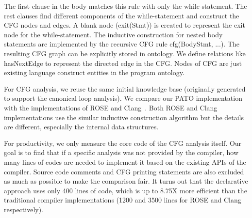 The first clause in the body matches this rule with only the \textsf{while}-statement. 
The rest clauses find different components of the \textsf{while}-statement and construct the CFG nodes and edges. 
A blank node (\textsf{exit(Stmt)}) is created to represent the exit node for the \textsf{while}-statement. 
The inductive construction for nested body statements are implemented by the recursive CFG rule \textsf{cfg(BodyStmt, ...)}.
The resulting CFG graph can be explicitly stored in ontology. 
We define relations like \textsf{hasNextEdge} to represent the directed edge in the CFG.
Nodes of CFG are just existing language construct entities in the program ontology.

\vspace*{.1in} 
For CFG analysis, we reuse the same initial knowledge base (originally generated to support the canonical loop analysis). 
We compare our PATO implementation with the implementations of ROSE and Clang~\cite{lattner2008llvm}. 
Both ROSE and Clang implementations use the similar inductive construction algorithm but the details are different, especially the internal data structures. 

For productivity, we only measure the core code of the CFG analysis itself. %
Our goal is to find that if a specific analysis was not provided by the compiler, how many lines of codes are needed to implement it based on the existing APIs of the compiler. 
Source code comments and CFG printing statements are also excluded as much as possible to make the comparison fair.  
It turns out that the declarative approach uses only 400 lines of code, which is up to 8.75X more efficient than the traditional compiler implementations (1200 and 3500 lines for ROSE and Clang respectively).

